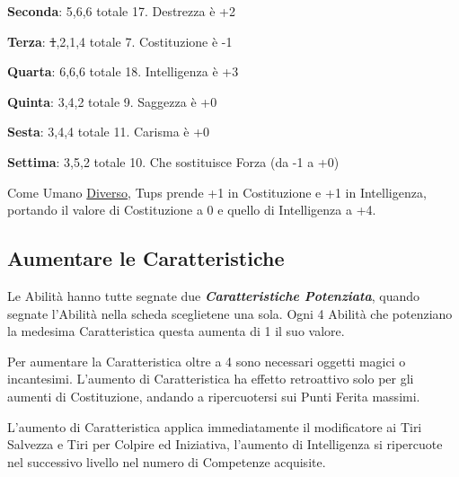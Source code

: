 \begin{multicols}{2}
\begin{changemargin}{0.3cm}{0.3cm}
\begin{tcolorbox}[title = Tiriamo le Caratteristiche di Tups]
		\textbf{Seconda}: 5,6,6 totale 17. Destrezza è +2

		\textbf{Terza}: \st{1},2,1,4 totale 7. Costituzione è -1

		\textbf{Quarta}: 6,6,6 totale 18. Intelligenza è +3

		\textbf{Quinta}: 3,4,2 totale 9. Saggezza è +0

		\textbf{Sesta}: 3,4,4 totale 11. Carisma è +0

		\textbf{Settima}: 3,5,2 totale 10. Che sostituisce Forza (da -1 a +0)

		Come Umano \hyperlink{diverso}{Diverso}, Tups prende +1 in Costituzione e +1 in Intelligenza, portando il valore di Costituzione a 0 e quello di Intelligenza a +4.

\end{tcolorbox}\end{changemargin}

\subsection{Aumentare le Caratteristiche}\label{aumentarelecaratteristiche}\hypertarget{aumentarelecaratteristiche}{}

Le Abilità hanno tutte segnate due \emph{\textbf{Caratteristiche Potenziata}}, quando segnate l'Abilità nella scheda sceglietene una sola. Ogni 4 Abilità che potenziano la medesima Caratteristica questa aumenta di 1 il suo valore.

Per aumentare la Caratteristica oltre a 4 sono necessari oggetti magici o incantesimi. L'aumento di Caratteristica ha effetto retroattivo solo per gli aumenti di Costituzione, andando a ripercuotersi sui Punti Ferita massimi.

L'aumento di Caratteristica applica immediatamente il modificatore ai Tiri Salvezza e Tiri per Colpire ed Iniziativa, l'aumento di Intelligenza si ripercuote nel successivo livello nel numero di Competenze acquisite.

\medskip


\end{multicols}
